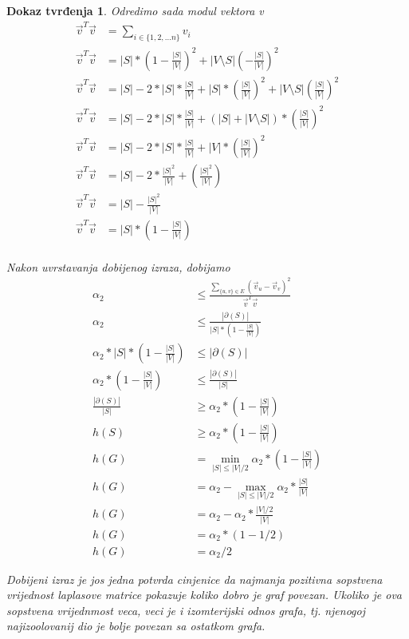 \documentclass[11pt]{article}
\newtheorem*{custom_proof}{Dokaz tvrđenja}
\begin{document}
\begin{custom_proof}
        Odredimo sada modul vektora v
        \[
            \begin{split}
                \vec{v}^T\vec{v} & = \sum_{i \in \{1,2, \dots n\}} v_i \\ 
                \vec{v}^T\vec{v} & = |S| * (1 - \frac{|S|}{|V|})^2 + |V \setminus S| (-\frac{|S|}{|V|})^2 \\ 
                \vec{v}^T\vec{v} & = |S| - 2 * |S| * \frac{|S|}{|V|} + |S| * (\frac{|S|}{|V|})^2 + |V \setminus S| (\frac{|S|}{|V|})^2 \\ 
                \vec{v}^T\vec{v} & = |S| - 2 * |S| * \frac{|S|}{|V|} + (|S| + |V \setminus S|) * (\frac{|S|}{|V|})^2 \\ 
                \vec{v}^T\vec{v} & = |S| - 2 * |S| * \frac{|S|}{|V|} + |V| * (\frac{|S|}{|V|})^2 \\ 
                \vec{v}^T\vec{v} & = |S| - 2 * \frac{|S|^2}{|V|} + (\frac{|S|^2}{|V|}) \\ 
                \vec{v}^T\vec{v} & = |S| - \frac{|S|^2}{|V|} \\ 
                \vec{v}^T\vec{v} & = |S| * ( 1 - \frac{|S|}{|V|}) \\ 
            \end{split}
            \]
            
            Nakon uvrstavanja dobijenog izraza, dobijamo
            \[
            \begin{split}
                \alpha_2  & \leq \frac{ \sum_{\{u,v\} \in E} (\vec{v}_u - \vec{v}_v)^2}{\vec{v}^T \vec{v}} \\
                \alpha_2  & \leq \frac{ |\partial(S)|}{|S| * ( 1 - \frac{|S|}{|V|})} \\ 
                \alpha_2 * |S| * ( 1 - \frac{|S|}{|V|}) & \leq |\partial(S)| \\
                \alpha_2 * ( 1 - \frac{|S|}{|V|}) & \leq \frac{|\partial(S)|}{|S|} \\ 
                \frac{|\partial(S)|}{|S|} & \geq  \alpha_2 * ( 1 - \frac{|S|}{|V|}) \\ 
                h(S) & \geq  \alpha_2 * ( 1 - \frac{|S|}{|V|}) \\ 
                h(G) & = \min_{|S| \leq |V| / 2}  \alpha_2 * ( 1 - \frac{|S|}{|V|}) \\ 
                h(G) & = \alpha_2  - \max_{|S| \leq |V| / 2}  \alpha_2 * \frac{|S|}{|V|} \\ 
                h(G) & = \alpha_2  - \alpha_2 * \frac{|V|/2}{|V|} \\ 
                h(G) & = \alpha_2  * (1 - 1/2) \\ 
                h(G) & = \alpha_2 / 2  
            \end{split}
            \]

            Dobijeni izraz je jos jedna potvrda cinjenice da najmanja pozitivna sopstvena vrijednost laplasove matrice pokazuje koliko dobro je graf povezan.
            Ukoliko je ova sopstvena vrijednmost veca, veci je i izomterijski odnos grafa, tj. njenogoj najizoolovanij dio je bolje povezan sa ostatkom grafa.

    \end{custom_proof}
\end{document}
